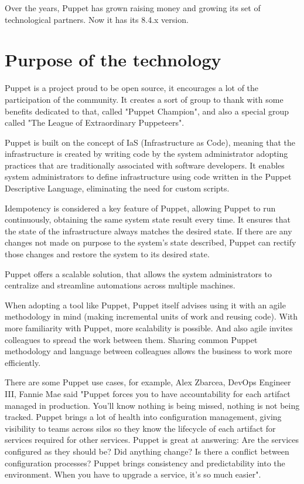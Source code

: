 \documentclass[12pt,a4paper,openright,twoside]{book}
\begin{document}
Over the years, Puppet has grown raising money and growing its set of technological partners.
Now it has its 8.4.x version.

\section{Purpose of the technology}
Puppet is a project proud to be open source, it encourages a lot of the participation of the community.
It creates a sort of group to thank with some benefits dedicated to that, called "Puppet Champion", and also a special group called "The League of Extraordinary Puppeteers"\cite{puppetDocChampions}.


Puppet is built on the concept of IaS (Infrastructure as Code), meaning that the infrastructure is created by writing code by the system administrator adopting practices that are traditionally associated with software developers.
It enables system administrators to define infrastructure using code written in the Puppet Descriptive Language, eliminating the need for custom scripts.


Idempotency is considered a key feature of Puppet, allowing Puppet to run continuously, obtaining the same system state result every time.
It ensures that the state of the infrastructure always matches the desired state.
If there are any changes not made on purpose to the system's state described, Puppet can rectify those changes and restore the system to its desired state.


Puppet offers a scalable solution, that allows the system administrators to centralize and streamline automations across multiple machines.


When adopting a tool like Puppet, Puppet itself advises using it with an agile methodology in mind (making incremental units of work and reusing code).
With more familiarity with Puppet, more scalability is possible. And also agile invites colleagues to spread the work between them.
Sharing common Puppet methodology and language between colleagues allows the business to work more efficiently.
\cite{puppetIntroMedium}\cite{puppetDocIntro}


There are some Puppet use cases, for example, Alex Zbarcea, DevOps Engineer III, Fannie Mae said "Puppet forces you to have accountability for each artifact managed in production. You'll know nothing is being missed, nothing is not being tracked. Puppet brings a lot of health into configuration management, giving visibility to teams across silos so they know the lifecycle of each artifact for services required for other services. Puppet is great at answering: Are the services configured as they should be? Did anything change? Is there a conflict between configuration processes? Puppet brings consistency and predictability into the environment. When you have to upgrade a service, it's so much easier"\cite{puppetDocUseCase}.
\end{document}
